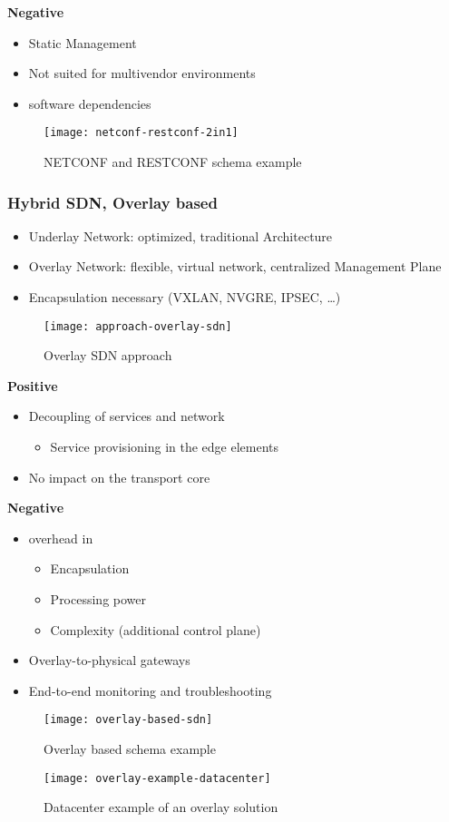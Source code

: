 \noindent
\textbf{Negative}
\begin{itemize}
	\item Static Management
    \item Not suited for multivendor environments 
	\item software dependencies  
\end{itemize}

\begin{figure}[h]
	\centering
	\texttt{[image: netconf-restconf-2in1]}
	\caption{NETCONF and RESTCONF schema example}
\end{figure}

\subsubsection{Hybrid SDN, Overlay based}
\begin{itemize}
	\item Underlay Network: optimized, traditional Architecture 
	\item Overlay Network: flexible, virtual network, centralized Management Plane 
	\item Encapsulation necessary (VXLAN, NVGRE, IPSEC, \ldots) 
\end{itemize}

\begin{figure}[h]
	\centering
	\texttt{[image: approach-overlay-sdn]}
	\caption{Overlay SDN approach}
\end{figure}

\noindent
\textbf{Positive}
\begin{itemize}
	\item Decoupling of services and network 
		\begin{itemize}\item Service provisioning in the edge elements\end{itemize}
	\item No impact on the transport core  
\end{itemize}

\noindent
\textbf{Negative}
\begin{itemize}
	\item overhead in 
	\begin{itemize} \item Encapsulation \item Processing power \item Complexity (additional control plane) \end{itemize} 
	\item Overlay-to-physical gateways
	\item End-to-end monitoring and troubleshooting  
\end{itemize}

\begin{figure}[h]
	\centering
	\texttt{[image: overlay-based-sdn]}
	\caption{Overlay based schema example}
\end{figure}

\begin{figure}[h]
	\centering
	\texttt{[image: overlay-example-datacenter]}
	\caption{Datacenter example of an overlay solution}
\end{figure}